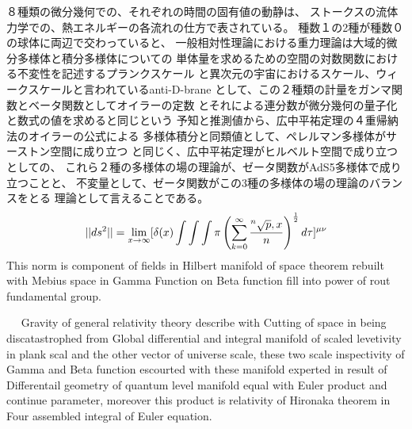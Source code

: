 \documentclass{jsarticle}
\begin{document}
  ８種類の微分幾何での、それぞれの時間の固有値の動静は、
  ストークスの流体力学での、熱エネルギーの各流れの仕方で表されている。
  種数１の2種が種数０の球体に両辺で交わっていると、
一般相対性理論における重力理論は大域的微分多様体と積分多様体についての 単体量を求めるための空間の対数関数における不変性を記述するプランクスケール と異次元の宇宙におけるスケール、ウィークスケールと言われているanti-D-brane として、この２種類の計量をガンマ関数とベータ関数としてオイラーの定数 とそれによる連分数が微分幾何の量子化と数式の値を求めると同じという 予知と推測値から、広中平祐定理の４重帰納法のオイラーの公式による 多様体積分と同類値として、ペレルマン多様体がサーストン空間に成り立つ と同じく、広中平祐定理がヒルベルト空間で成り立つとしての、 これら２種の多様体の場の理論が、ゼータ関数がAdS5多様体で成り立つことと、 不変量として、ゼータ関数がこの3種の多様体の場の理論のバランスをとる
  理論として言えることである。
$$ ||ds^2|| = \lim_{x \to \infty} [\delta(x) \int \int \int \pi \left( \sum_{k=0}^{\infty}
		{{}^n\sqrt{p},x \over n} \right)
^{1 \over 2}d \tau]^{\mu\nu} $$
  This norm is component of fields in Hilbert manifold of space theorem rebuilt with
Mebius space in Gamma Function on Beta function fill into power of rout fundamental
group.

  　 Gravity of general relativity theory describe with Cutting of space
in being discatastrophed from Global differential and integral manifold
of scaled levetivity in plank scal and the other vector of universe
scale, these two scale inspectivity of Gamma and Beta function escourted
with these manifold experted in result of Differentail geometry of
quantum level manifold equal with Euler product and continue parameter,
moreover this product is relativity of Hironaka theorem in Four assembled
integral of Euler equation.

   \newcommand{\variint}{%
	\begin{picture}(15,30)
		\put(0,0){
			$ \iint $}
		\put(0,5){\line(15,0){15}}
	\end{picture} %
}

\newcommand{\variiint}{%
	\begin{picture}(15,15)
		\put(0,0){
			$ \iiint $}
		\put(0,5){\line(15,0){20}}
	\end{picture} %
}



 \newcommand{\alearletter}{%
	 \begin{picture}(10,20)
		 \put(0,0){
			 $ \square $}
		 \put(0,0){\line(1,1){10}}
	 \end{picture} %
	 }
\end{document}
